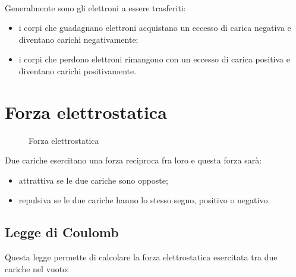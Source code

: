 \paragraph{}
Generalmente sono gli elettroni a
essere trasferiti:

\begin{itemize}
    \item i corpi che guadagnano elettroni acquistano un eccesso di carica negativa e diventano carichi negativamente;
    \item i corpi che perdono elettroni rimangono con un eccesso di carica positiva e diventano carichi positivamente.
\end{itemize}


\section{Forza elettrostatica}

\def\a{2.5}
\def\R{0.33}
\def\F{1.8}
\begin{figure}[H]
    \centering
    \caption{Forza elettrostatica}
    \label{fig:forzaElettrica}
\end{figure}

Due cariche esercitano una forza reciproca fra loro e questa forza sarà:
\begin{itemize}
    \item attrattiva se le due cariche sono opposte;
    \item repulsiva se le due cariche hanno lo stesso segno, positivo o negativo.
\end{itemize}




\subsection{Legge di Coulomb}
Questa legge permette di calcolare la forza elettrostatica esercitata tra due cariche nel vuoto:

